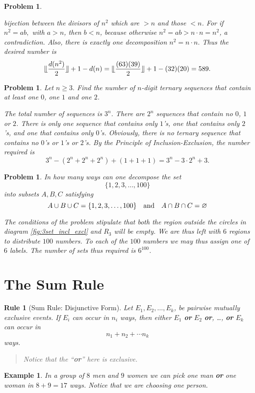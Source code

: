 \documentclass[11pt, openany]{book}
\theoremstyle{change} \theoremheaderfont{\blue\sffamily\bfseries}
\newtheorem{rul}[thm]{Rule}
\newtheorem{exa}[thm]{Example}
\newtheorem{pro}[thm]{Problem}
\theoremstyle{nonumberplain} \theoremheaderfont{\sffamily\bfseries}
\newenvironment{rem}[0]{\begin{quote}{\huge\textcolor{red}{\Pisymbol{pzd}{43}}}\itshape }{\end{quote}}
\newcommand{\í}{\'{\i}}
\begin{document}
\begin{multicols}{2}
\begin{pro}
\begin{answer}
bijection between the divisors of $n^2$ which are $> n$ and those $<
n$. For if $n^2 = ab,$ with $a > n$, then $b < n$, because otherwise
$n^2 = ab > n\cdot n = n^2$, a contradiction. Also, there is exactly
one decomposition $n^2 = n\cdot n.$ Thus the desired number is
$$\llfloor\frac{d(n^2)}{2}\rrfloor + 1 - d(n) =
\llfloor\frac{(63)(39)}{2}\rrfloor + 1 - (32)(20) = 589.$$
\end{answer}
\end{pro}
\begin{pro}Let $n \geq 3.$ Find the number of $n$-digit ternary sequences
that contain at least one $0$, one $1$ and one $2$.
\begin{answer} The total number of sequences is $3^n$. There are
$2^n$ sequences that contain no $0$, $1$ or $2$. There is only one
sequence that contains only $1$'s, one that contains only $2$'s, and
one that contains only $0$'s. Obviously, there is no ternary
sequence that contains no $0$'s or $1$'s or $2$'s. By the Principle
of Inclusion-Exclusion, the number required is
$$ 3^n - (2^n + 2^n + 2^n) + (1 + 1 + 1) = 3^n - 3\cdot 2^n + 3.$$
\end{answer}
\end{pro}
\begin{pro}
In how many ways can one decompose the set $$\{1, 2, 3, \ldots ,
100\}$$ into subsets $A, B, C$ satisfying
$$ A \cup B \cup C = \{1, 2, 3, \ldots , 100\} \ \ \ {\rm and} \ \ \ A \cap B \cap C = \varnothing$$
\begin{answer} The conditions of the problem stipulate that both the region
outside the circles in diagram \ref{fig:3set_incl_excl} and $R_3$
will be empty. We are thus left with $6$ regions to distribute $100$
numbers. To each of the $100$ numbers we may thus assign one of $6$
labels. The number of sets thus required is $6^{100}$.
\end{answer}
\end{pro}
\end{multicols}


\section{The Sum Rule}
\begin{rul}[Sum Rule: Disjunctive Form] Let $E_1, E_2, \ldots, E_k$, be pairwise mutually exclusive events. If $E_i$ can
occur in $n_i$ ways, then either $E_1$ {\bf or} $E_2$ {\bf or},
\ldots, {\bf or} $E_k$ can occur in $$ n_1 + n_2 + \cdots n_k
$$ways.
\end{rul}
\begin{rem}
Notice that the ``{\bf or}'' here is exclusive.
\end{rem}
\begin{exa}
In a group of $8$ men and $9$ women we can pick one man {\bf or} one
woman in $8+  9 = 17$ ways. Notice that we are choosing one person.
\end{exa}
\end{document}
